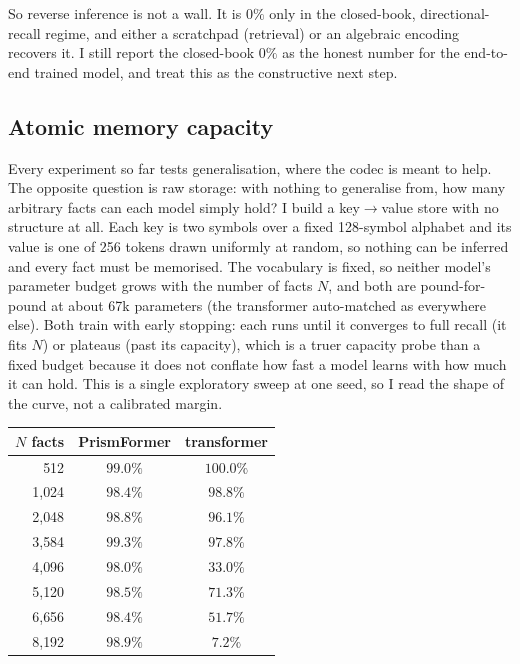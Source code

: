 \documentclass[11pt]{article}
\begin{document}
So reverse inference is not a wall. It is $0\%$ only in the closed-book, directional-recall regime, and
either a scratchpad (retrieval) or an algebraic encoding recovers it. I still report the closed-book
$0\%$ as the honest number for the end-to-end trained model, and treat this as the constructive next step.

\subsection{Atomic memory capacity}\label{sec:capacity}

Every experiment so far tests generalisation, where the codec is meant to help. The opposite question is
raw storage: with nothing to generalise from, how many arbitrary facts can each model simply hold? I build
a key$\to$value store with no structure at all. Each key is two symbols over a fixed 128-symbol alphabet
and its value is one of 256 tokens drawn uniformly at random, so nothing can be inferred and every fact
must be memorised. The vocabulary is fixed, so neither model's parameter budget grows with the number of
facts $N$, and both are pound-for-pound at about 67k parameters (the transformer auto-matched as
everywhere else). Both train with early stopping: each runs until it converges to full recall (it fits
$N$) or plateaus (past its capacity), which is a truer capacity probe than a fixed budget because it does
not conflate how fast a model learns with how much it can hold. This is a single exploratory sweep at one
seed, so I read the shape of the curve, not a calibrated margin.

\begin{center}
\begin{tabular}{@{}rcc@{}}
\toprule
$N$ facts & PrismFormer & transformer \\
\midrule
512 & $99.0\%$ & $100.0\%$ \\
1{,}024 & $98.4\%$ & $98.8\%$ \\
2{,}048 & $98.8\%$ & $96.1\%$ \\
3{,}584 & $99.3\%$ & $97.8\%$ \\
4{,}096 & $\mathbf{98.0\%}$ & $33.0\%$ \\
5{,}120 & $\mathbf{98.5\%}$ & $71.3\%$ \\
6{,}656 & $\mathbf{98.4\%}$ & $51.7\%$ \\
8{,}192 & $\mathbf{98.9\%}$ & $7.2\%$ \\
\bottomrule
\end{tabular}
\end{center}
\end{document}
